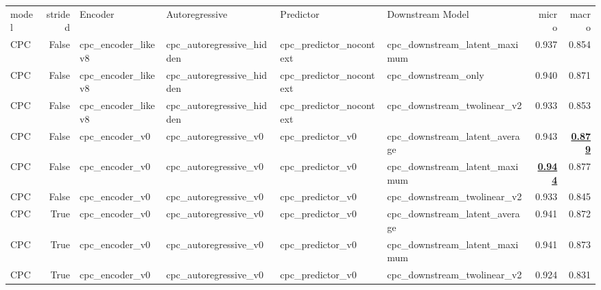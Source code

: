 \begin{adjustbox}{width=\textwidth}
\begin{tabular}{lrllllrr}
{model} & {strided} & {Encoder} & {Autoregressive} & {Predictor} & {Downstream Model} & {micro} & {macro} \\
CPC & False & cpc\_encoder\_likev8 & cpc\_autoregressive\_hidden & cpc\_predictor\_nocontext & cpc\_downstream\_latent\_maximum & 0.937 & 0.854 \\
CPC & False & cpc\_encoder\_likev8 & cpc\_autoregressive\_hidden & cpc\_predictor\_nocontext & cpc\_downstream\_only & 0.940 & 0.871 \\
CPC & False & cpc\_encoder\_likev8 & cpc\_autoregressive\_hidden & cpc\_predictor\_nocontext & cpc\_downstream\_twolinear\_v2 & 0.933 & 0.853 \\
CPC & False & cpc\_encoder\_v0 & cpc\_autoregressive\_v0 & cpc\_predictor\_v0 & cpc\_downstream\_latent\_average & 0.943 & \bfseries \underline{0.879} \\
CPC & False & cpc\_encoder\_v0 & cpc\_autoregressive\_v0 & cpc\_predictor\_v0 & cpc\_downstream\_latent\_maximum & \bfseries \underline{0.944} & 0.877 \\
CPC & False & cpc\_encoder\_v0 & cpc\_autoregressive\_v0 & cpc\_predictor\_v0 & cpc\_downstream\_twolinear\_v2 & 0.933 & 0.845 \\
CPC & True & cpc\_encoder\_v0 & cpc\_autoregressive\_v0 & cpc\_predictor\_v0 & cpc\_downstream\_latent\_average & 0.941 & 0.872 \\
CPC & True & cpc\_encoder\_v0 & cpc\_autoregressive\_v0 & cpc\_predictor\_v0 & cpc\_downstream\_latent\_maximum & 0.941 & 0.873 \\
CPC & True & cpc\_encoder\_v0 & cpc\_autoregressive\_v0 & cpc\_predictor\_v0 & cpc\_downstream\_twolinear\_v2 & 0.924 & 0.831 \\
\end{tabular}
\end{adjustbox}